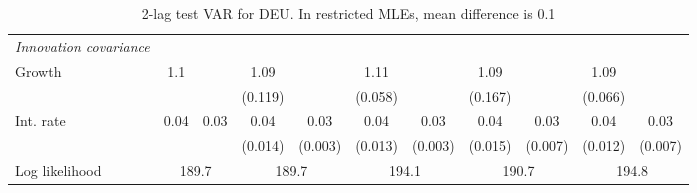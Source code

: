 \begin{table}[htbp]
\begin{tabular}{@{\extracolsep{4pt}}lcccccccccc@{}}
\rule{0pt}{4ex} \emph{Innovation covariance}  	 & 	 & 	 & 	 & 	 & 	 & 	 & 	 & 	 & 	 &\\ 
\quad Growth 	 &1.1 	 &  	 & 1.09 	 &  	 & 1.11 	 &  	 & 1.09 	 &  	 & 1.09 	 & 	 \\ 
 		 &  	 &  	 & (0.119) 	 &  	 & (0.058) 	 &  	 & (0.167) 	 &  	 & (0.066) 	 &  	 \\ 
\quad Int. rate 	 &0.04 	 & 0.03 	 & 0.04 	 & 0.03 	 & 0.04 	 & 0.03 	 & 0.04 	 & 0.03 	 & 0.04 	 & 0.03	 \\ 
 		 &  	 &  	 & (0.014) 	 & (0.003) 	 & (0.013) 	 & (0.003) 	 & (0.015) 	 & (0.007) 	 & (0.012) 	 & (0.007) 	 \\ 
 \hline \rule{0pt}{4ex} 
  Log likelihood 	 &\multicolumn{2}{c}{189.7} 	 & \multicolumn{2}{c}{189.7} 	 & \multicolumn{2}{c}{194.1} 	 & \multicolumn{2}{c}{190.7} 	 & \multicolumn{2}{c}{194.8}\\ 

 \hline 	\end{tabular}		\caption{2-lag test VAR for DEU. In restricted MLEs, mean difference is 0.1}
		\label{tab:DEU2lag}

\end{table}